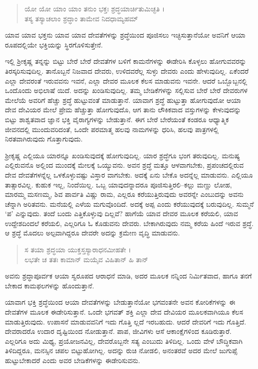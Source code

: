 \begin{verse}
ಯೋ ಯೋ ಯಾಂ ಯಾಂ ತನುಂ ಭಕ್ತಃ ಶ್ರದ್ಧಯಾರ್ಚಿತುಮಿಚ್ಛತಿ ।\\ತಸ್ಯ ತಸ್ಯಾಚಲಾಂ ಶ್ರದ್ಧಾಂ ತಾಮೇವ ನಿದಧಾಮ್ಯಹಮ್ 
\end{verse}

{\small ಯಾವ ಯಾವ ಭಕ್ತನು ಯಾವ ಯಾವ ದೇವತೆಗಳನ್ನು ಶ್ರದ್ಧೆಯಿಂದ ಪೂಜಿಸಲು ಇಚ್ಛಿಸುತ್ತಾನೆಯೋ ಅವನಿಗೆ ಆಯಾ ರೂಪದಲ್ಲಿಯೇ ಭಕ್ತಿಯನ್ನು ಸ್ಥಿರಗೊಳಿಸುತ್ತೇನೆ.}

ಇಲ್ಲಿ ಶ್ರೀಕೃಷ್ಣ ತನ್ನನ್ನು ಬಿಟ್ಟು ಬೇರೆ ಬೇರೆ ದೇವತೆಗಳ ಬಳಿಗೆ ಕಾಮನೆಗಳನ್ನು ಈಡೇರಿಸಿ ಕೊಳ್ಳಲು ಹೋಗುವವರನ್ನು ತಿರಸ್ಕರಿಸುವುದಿಲ್ಲ. ತಾನೊಬ್ಬನೆ ನಿಜವಾದ ದೇವರು, ಉಳಿದವರೆಲ್ಲ ಸುಳ್ಳು ದೇವರು ಎಂದು ಹೇಳುವುದಿಲ್ಲ. ಏಕೆಂದರೆ ಎಲ್ಲಾ ದೇವರಂತೆ ಇರುವವನು ಇವನೆ, ಎಲ್ಲಾ ದೇವರ ಮೂಲಕ ಕೆಲಸ ಮಾಡುವನು ಇವನೇ. ಆದರೆ ಒಬ್ಬೊಬ್ಬನಲ್ಲಿ ಒಂದೊಂದು ಅಭಿಲಾಷೆ ಯಿದೆ. ಅದನ್ನು ಖಂಡಿಸುವುದಿಲ್ಲ. ತಮ್ಮ ಬೇಡಿಕೆಗಳನ್ನು ಸಲ್ಲಿಸುವ ಬೇರೆ ಬೇರೆ ದೇವರುಗಳ ಮೇಲೆಯೆ ಅವರಿಗೆ ಹೆಚ್ಚು ಶ್ರದ್ಧೆ ಹುಟ್ಟುವಂತೆ ಮಾಡುತ್ತಾನೆ. ಯಾವಾಗ ಶ್ರದ್ಧೆ ಹುಟ್ಟುತ್ತಾ ಹೋಗುವುದೋ ಆಯಾ ದೇವ ದೇವಿಯರ ಮೇಲೆ ಪ್ರೇಮ ಹೆಚ್ಚುತ್ತಾ ಹೋಗುವುದೊ, ಆಗ ತಾನು ಲೌಕಿಕವಾದ ವಸ್ತುಗಳನ್ನು ಕೇಳುವುದನ್ನು ಬಿಟ್ಟು ಶಾಶ್ವತವಾದ ಜ್ಞಾನ ಭಕ್ತಿ ವೈರಾಗ್ಯಗಳನ್ನು ಬೇಡುತ್ತಾನೆ. ಈಗ ಬೇರೆ ಬೇರೆಯಂತೆ ಕಂಡರೂ ಆಧ್ಯಾತ್ಮಿಕ ಜೀವನದಲ್ಲಿ ಮುಂದುವರಿದಂತೆ, ಒಂದೇ ಪರಮಾತ್ಮ ಹಲವು ನಾಮಗಳನ್ನು ಧರಿಸಿ, ಹಲವು ಪಾತ್ರಗಳಲ್ಲಿ ನಿರತವಾಗಿರುವುದು ಗೊತ್ತಾಗುವುದು.

ಶ್ರೀಕೃಷ್ಣ ಎಲ್ಲಿಯೂ ಯಾರನ್ನೂ ಖಂಡಿಸುವುದಕ್ಕೆ ಹೋಗುವುದಿಲ್ಲ. ಯಾರ ಶ್ರದ್ಧೆಗೂ ಭಂಗ ತರುವುದಿಲ್ಲ. ಮನುಷ್ಯ ಎಲ್ಲಿರುವನೊ ಅಲ್ಲಿಂದ ಮುಂದಕ್ಕೆ ಮೇಲಕ್ಕೆ ಒಯ್ಯುವನು. ಅವನ ಶ್ರದ್ಧೆ ಮತ್ತೂ ಆಳವಾಗಬೇಕು, ಪ್ರಪಂಚದಲ್ಲಿರುವ ದೇವ ದೇವತೆಗಳನ್ನೆಲ್ಲ ಒಳಕೊಳ್ಳುವಷ್ಟು ವಿಸ್ತಾರ ವಾಗಬೇಕು. ಅದಕ್ಕೆ ಏನು ಬೇಕೊ ಅದನ್ನೆಲ್ಲ ಮಾಡುವನು. ಎಲ್ಲಿಯೂ ತಾತ್ಸಾರವಿಲ್ಲ. ಕುಹುಕ ಇಲ್ಲ, ನಿಂದೆಯಿಲ್ಲ. ಒಬ್ಬ ಯಾವುದನ್ನಾದರೂ ಪೂಜಿಸುತ್ತಿರಲಿ–ಕಲ್ಲು ಮಣ್ಣು ಲೋಹ, ಮಾರಮ್ಮ ಮಸಣಮ್ಮ, ಶಿವ ಪಾರ್ವತಿ ವಿಷ್ಣು ರಾಮ, ಎಲ್ಲರೂ ಕರೆಯುತ್ತಿರುವುದು ಅವರನ್ನೇ ಎಂಬುದನ್ನು ಅವನು ಚೆನ್ನಾಗಿ ಅರಿತವನು. ಮನೆಯಲ್ಲಿ ಎಳೆಯ ಮಗುವೊಂದಿದೆ. ಅದಕ್ಕೆ ಅಪ್ಪ ಎಂದು ಕರೆಯುವುದಕ್ಕೆ ಬರುವುದಿಲ್ಲ. ಸುಮ್ಮನೆ ‘ಪ’ ಎನ್ನುವುದು. ತಂದೆ ಬಂದು ಎತ್ತಿಕೊಳ್ಳುವು ದಿಲ್ಲವೆ? ಹಾಗೆಯೆ ಯಾವ ದೇವರ ಮೂಲಕ ಕರೆಯಲಿ, ಯಾವ ಉದ್ದೇಶದಿಂದಲೆ ಕರೆಯಲಿ, ಎಲ್ಲರಿಗೂ ಓ ಕೊಡುವನು ದೇವರು. ಬೇಕಾಗಿರುವುದು ನಮ್ಮ ಕರೆಯ ಹಿಂದೆ ಇರುವ ಶ್ರದ್ಧೆ. ಆ ಶ್ರದ್ಧೆ ಮೊದಲು ಅಲ್ಪವಾಗಿದ್ದರೂ ದೇವರೇ ಅದನ್ನು ಕ್ರಮೇಣ ವೃದ್ಧಿ ಮಾಡುವನು.

\begin{verse}
ಸ ತಯಾ ಶ್ರದ್ಧಯಾ ಯುಕ್ತಸ್ತಸ್ಯಾರಾಧನಮೀಹತೇ ।\\ಲಭತೇ ಚ ತತಃ ಕಾಮಾನ್ ಮಯೈವ ವಿಹಿತಾನ್ ಹಿ ತಾನ್ 
\end{verse}

{\small ಅವನು ಶ್ರದ್ಧಾಪೂರ್ವಕ ಆಯಾ ಸ್ವರೂಪದ ಆರಾಧನೆ ಮಾಡಿ, ಅದರ ಮೂಲಕ ನನ್ನಿಂದ ನಿರ್ಮಿತವಾದ, ಹಾಗೂ ತನಗೆ ಬೇಕಾದ ಕಾಮಫಲಗಳನ್ನು ಹೊಂದುತ್ತಾನೆ.}

ಯಾವಾಗ ಭಕ್ತಿ ಶ್ರದ್ಧೆಯಿಂದ ಆಯಾ ದೇವತೆಗಳನ್ನು ಬೇಡುತ್ತಾನೆಯೋ ಭಗವಂತನೇ ಅವನ ಕೋರಿಕೆಗಳನ್ನು ಈ ದೇವತೆಗಳ ಮೂಲಕ ಈಡೇರಿಸುತ್ತಾನೆ. ಒಂದೇ ಭಗವತ್ ಶಕ್ತಿ ಎಲ್ಲಾ ದೇವ ದೇವಿಯರ ಮೂಲಕವಾಗಿಯೂ ಕೆಲಸ ಮಾಡುತ್ತಿರುವುದು. ಉಪಾಸನೆ ಮಾಡುವವನಿಗೆ ಇದು ಗೊತ್ತಿ ಲ್ಲದೆ ಇರಬಹುದು. ಆದರೆ ದೇವರಿಗೆ ಇದು ಗೊತ್ತಿದೆ. ದೇವರಾದರೊ ಉದಾರ ದೃಷ್ಟಿಯಿಂದ ನೋಡುತ್ತಾನೆ. ಪಾಪ, ಜೀವಿಗಳು ಆಸೆ ಆಕಾಂಕ್ಷೆಗಳಿಂದ ಕೂಡಿರುತ್ತಾರೆ. ಎಲ್ಲರಿಗೂ ಅದು ಮಿಥ್ಯ, ಪ್ರಯೋಜನವಿಲ್ಲ, ದೇವರೊಬ್ಬನೇ ಸತ್ಯ ಎಂಬುದು ತಿಳಿದಿಲ್ಲ. ಒಂದು ವೇಳೆ ಬೌದ್ಧಿಕವಾಗಿ ತಿಳಿದಿದ್ದರೂ, ಮನಸ್ಸಿನ ಚಪಲ ಬಿಟ್ಟುಹೋಗಿಲ್ಲ. ಅದನ್ನು ರುಚಿ ನೋಡಲಿ, ಅನಂತರವೆ ಅದರ ಮೇಲೆ ಜುಗುಪ್ಸೆ ಹುಟ್ಟುಬೇಕಾದರೆ ಎಂದು ಅವರ ಬೇಡಿಕೆಗಳನ್ನು ಈಡೇರಿಸುವನು.


